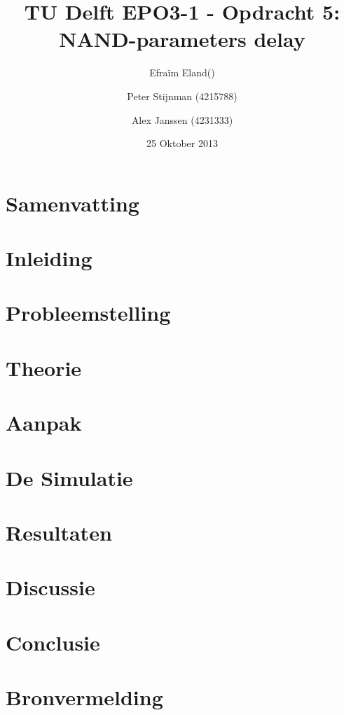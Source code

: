 \documentclass{article}
\author{
Efraïm Eland() \and Peter Stijnman (4215788) \and Alex Janssen (4231333) \\
}
\title{TU Delft EPO3-1 - Opdracht 5: NAND-parameters delay}
\date{25 Oktober 2013}
\begin{document}
\maketitle

\section{Samenvatting}


\tableofcontents
\clearpage

\section{Inleiding}

\section{Probleemstelling}

\section{Theorie}

\section{Aanpak}


\section{De Simulatie}
 

\section{Resultaten}


\section{Discussie}


\section{Conclusie}


\section{Bronvermelding}
\end{document}

